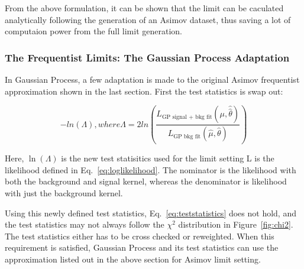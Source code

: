 %


From the above formulation, it can be shown that the limit can be caculated analytically following the generation of an Asimov dataset, thus saving a lot of computaion power from the full limit generation. 

\subsubsection{The Frequentist Limits: The Gaussian Process Adaptation}

In Gaussian Process, a few adaptation is made to the original Asimov frequentist approximation shown in the last section. First the test statistics is swap out:

\begin{equation}
    -ln(\Lambda), where \Lambda= 2ln(\frac{L_{\textrm{GP signal + bkg fit}}(\mu, \hat{\hat{\theta}})}{L_{\textrm{GP bkg fit}}(\hat{\mu}, \hat{\theta})})
\end{equation}

Here, $\ln(\Lambda)$ is the new test statisitics used for the limit setting L is the likelihood defined in Eq.~\ref{eq:loglikelihood}. The nominator is the likelihood with both the background and signal kernel, whereas the denominator is likelihood with just the background kernel. 

Using this newly defined test statistics, Eq.~\ref{eq:teststatistics} does not hold, and the test statistics may not always follow the $\chi^{2}$ distribution in Figure~\ref{fig:chi2}. The test statistics either has to be cross checked or reweighted. When this requirement is satisfied, Gaussian Process and its test statistics can use the approximation listed out in the above section for Asimov limit setting.




